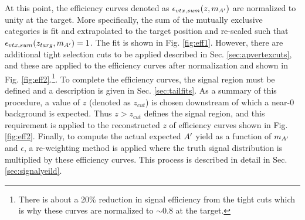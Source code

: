 At this point, the efficiency curves denoted as $\epsilon_{vtx,sum}(z,m_{A^\prime})$ are normalized to unity at the target. More specifically, the sum of the mutually exclusive categories is fit and extrapolated to the target position and re-scaled such that $\epsilon_{vtx,sum}(z_{targ},m_{A^\prime})=1$. The fit is shown in Fig. \ref{fig:eff1}. However, there are additional tight selection cuts to be applied described in Sec. \ref{sec:apvertexcuts}, and these are applied to the efficiency curves after normalization and shown in Fig. \ref{fig:eff2}.\footnote{There is about a 20\% reduction in signal efficiency from the tight cuts which is why these curves are normalized to $\sim$0.8 at the target.}. To complete the efficiency curves, the signal region must be defined and a description is given in Sec. \ref{sec:tailfits}. As a summary of this procedure, a value of $z$ (denoted as $z_{cut}$) is chosen downstream of which a near-0 background is expected. Thus $z>z_{cut}$ defines the signal region, and this requirement is applied to the reconstructed $z$ of efficiency curves shown in Fig. \ref{fig:eff2}. Finally, to compute the actual expected $A^\prime$ yield as a function of $m_{A^\prime}$ and $\epsilon$, a re-weighting method is applied where the truth signal distribution is multiplied by these efficiency curves. This process is described in detail in Sec. \ref{sec:signalyeild}.

